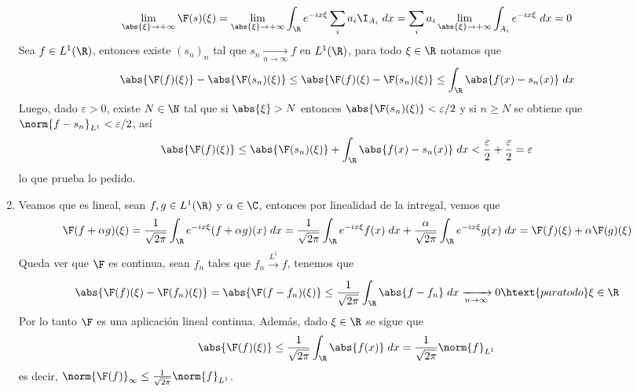 \documentclass{article}
\begin{document}
\begin{enumerate}
\begin{equation*}
        \lim\limits_{\abs{\xi}\to+\infty}\F(s)(\xi)=\lim\limits_{\abs{\xi}\to+\infty}\int_{\R}
        e^{-ix\xi}\sum_{i}a_{i}\I_{A_{i}}\hspace{1mm}dx=\sum_{i}a_{i}
        \lim\limits_{\abs{\xi}\to+\infty}\int_{A_{i}}e^{-ix\xi}\hspace{1mm}dx=0
    \end{equation*}
    Sea $f\in L^{1}(\R)$, entonces existe $(s_{n})_{n}$ tal que $s_{n}\xrightarrow[n\to\infty]{}f$
    en $L^{1}(\R)$, para todo $\xi\in\R$ notamos que
    \begin{equation*}
        \abs{\F(f)(\xi)}-\abs{\F(s_{n})(\xi)}\leq\abs{\F(f)(\xi)-\F(s_{n})(\xi)}
        \leq\int_{\R}\abs{f(x)-s_{n}(x)}\hspace{1mm}dx
    \end{equation*}
    Luego, dado $\varepsilon>0$, existe $N\in\N$ tal que si $\abs{\xi}>N$ entonces 
    $\abs{\F(s_{n})(\xi)}<\varepsilon/2$ y si $n\geq N$ se obtiene que 
    $\norm{f-s_{n}}_{L^{1}}<\varepsilon/2$, así
    \begin{equation*}
        \abs{\F(f)(\xi)}\leq\abs{\F(s_{n})(\xi)}+\int_{\R}\abs{f(x)-s_{n}(x)}\hspace{1mm}dx
        <\frac{\varepsilon}{2}+\frac{\varepsilon}{2}=\varepsilon
    \end{equation*}
    lo que prueba lo pedido.
    
    \item Veamos que es lineal, sean $f,g\in L^{1}(\R)$ y $\alpha\in\C$, entonces por linealidad
    de la intregal, vemos que
    \begin{equation*}
        \F(f+\alpha g)(\xi)=\frac{1}{\sqrt{2\pi}}\int_{\R}e^{-ix\xi}(f+\alpha g)(x)\hspace{1mm}dx
        =\frac{1}{\sqrt{2\pi}}\int_{\R}e^{-ix\xi}f(x)\hspace{1mm}dx
        +\frac{\alpha}{\sqrt{2\pi}}\int_{\R}e^{-ix\xi}g(x)\hspace{1mm}dx
        =\F(f)(\xi)+\alpha\F(g)(\xi)
    \end{equation*}
    Queda ver que $\F$ es continua, sean $f_{n}$ tales que $f_{n}\xrightarrow[]{L^{1}}f$, tenemos 
    que
    \begin{equation*}
        \abs{\F(f)(\xi)-\F(f_{n})(\xi)}=\abs{\F(f-f_{n})(\xi)}
        \leq\frac{1}{\sqrt{2\pi}}\int_{\R}\abs{f-f_{n}}\hspace{1mm}dx\xrightarrow[n\to\infty]{}0
        \htext{para todo }\xi\in\R
    \end{equation*}
    Por lo tanto $\F$ es una aplicación lineal continua. Además, dado $\xi\in\R$ se sigue que
    \begin{equation*}
        \abs{\F(f)(\xi)}\leq\frac{1}{\sqrt{2\pi}}\int_{\R}\abs{f(x)}\hspace{1mm}dx
        =\frac{1}{\sqrt{2\pi}}\norm{f}_{L^{1}}
    \end{equation*}
    es decir, $\norm{\F(f)}_{\infty}\leq\frac{1}{\sqrt{2\pi}}\norm{f}_{L^{1}}$.
    

\end{enumerate}
\end{document}
